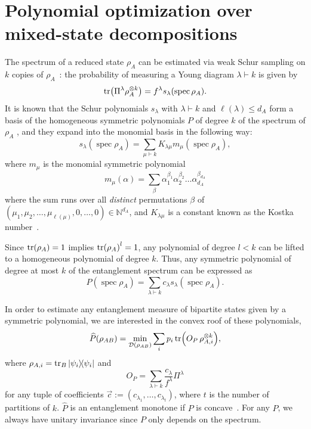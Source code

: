 \documentclass[aps,pra,twocolumn,superscriptaddress]{revtex4-2}
\DeclareMathOperator{\spec}{spec}
\renewcommand{\a}{\alpha}
\newcommand{\N}{\mathds{N}}
\begin{document}
\section{Polynomial optimization over mixed-state decompositions}
The spectrum of a reduced state $\rho_A$ can be estimated via weak Schur sampling on $k$ copies of $\rho_A$~\cite{Alicki1988,Keyl2001EstimatingSpectrum}: the probability of measuring a Young diagram $\lambda \vdash k$ is given by
\begin{equation}
    \tr(\Pi^\lambda \rho_A^{\otimes k}) = f^\lambda s_\lambda(\spec\rho_A).
\end{equation}
It is known that the Schur polynomials $s_\lambda$ with $\lambda \vdash k$ and $\ell(\lambda) \leq d_A$ form a basis of the homogeneous symmetric polynomials $P$ of degree $k$ of the spectrum of $\rho_A$ \cite{MacdonaldSymmFunc}, and they expand into the monomial basis in the following way:
\begin{equation}
    s_\lambda(\spec\rho_A) = \sum_{\mu \vdash k} K_{\lambda\mu}m_\mu(\spec\rho_A),
\end{equation}
where $m_\mu$ is the monomial symmetric polynomial
\begin{equation}
    m_\mu(\a) = \sum_{\beta} \a_1^{\beta_1}\a_2^{\beta_2}\dots\a_{d_A}^{\beta_{d_A}}
\end{equation}
where the sum runs over all {\em distinct} permutations $\beta$ of $(\mu_1, \mu_2, \dots, \mu_{\ell(\mu)}, 0,\dots, 0) \in \N^{d_A}$, and $K_{\lambda\mu}$ is a constant known as the Kostka number~\cite{MacdonaldSymmFunc}.

Since $\tr(\rho_A) = 1$ implies $\tr(\rho_A)^{l} = 1$, any polynomial of degree $l < k$ can be lifted to a homogeneous polynomial of degree $k$. Thus, any symmetric polynomial of degree at most $k$ of the entanglement spectrum can be expressed as
\begin{equation}
    P(\spec\rho_A) = \sum_{\lambda\vdash k}c_\lambda s_\lambda(\spec\rho_A).
\end{equation}

In order to estimate any entanglement measure of bipartite states given by a symmetric polynomial, we are interested in the convex roof of these polynomials,
\begin{equation}\label{eq:PrhoABcroof}
    \widehat{P}(\rho_{AB}) = \min_{\mathcal{D}(\rho_{AB})} \sum_i p_i \tr(O_P\, \rho_{A,i}^{\otimes k}),
\end{equation}
where $\rho_{A,i}=\tr_B\dyad{\psi_i}$ and
\begin{equation}\label{eq:OP}
    O_P = \sum_{\lambda \vdash k} \frac{c_\lambda}{f^\lambda} \Pi^\lambda
\end{equation}
for any tuple of coefficients $\vec{c}:=(c_{\lambda_1},\dots,c_{\lambda_t})$, where $t$ is the number of partitions of $k$. $\widehat{P}$ is an entanglement monotone if $P$ is concave~\cite{Vidal_2000}. For any $P$, we always have unitary invariance since $P$ only depends on the spectrum.
\end{document}
